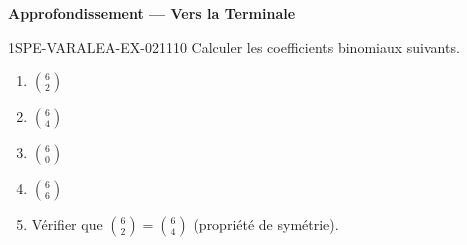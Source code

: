 \begin{center}\textbf{Approfondissement — Vers la Terminale}\end{center}
\begin{exercice}{1SPE-VARALEA-EX-021}{1}{10}
Calculer les coefficients binomiaux suivants.
\begin{enumerate}
  \item $\binom{6}{2}$
  \item $\binom{6}{4}$
  \item $\binom{6}{0}$
  \item $\binom{6}{6}$
  \item Vérifier que $\binom{6}{2} = \binom{6}{4}$ (propriété de symétrie).
\end{enumerate}
\end{exercice}
